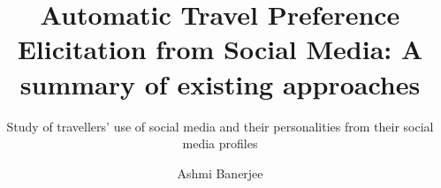 \documentclass[sigconf]{acmart}
\begin{document}
\title{Automatic Travel Preference Elicitation from Social Media: A summary of existing approaches}
\subtitle{Study of travellers' use of social media and their personalities from their social media profiles}

\author{Ashmi Banerjee}

\renewcommand{\shortauthors}{Ashmi Banerjee}


\begin{abstract}

\end{abstract}


\maketitle






\end{document}
